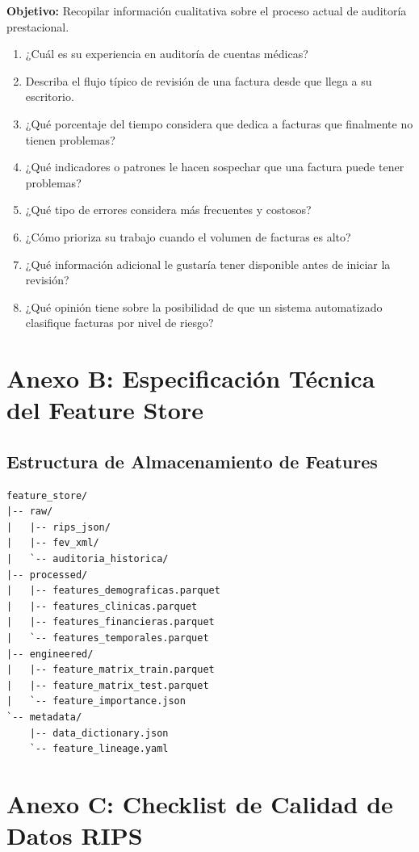 \documentclass[12pt,letterpaper]{report}
\begin{document}
\textbf{Objetivo:} Recopilar información cualitativa sobre el proceso actual de auditoría prestacional.
\begin{enumerate}
    \item ¿Cuál es su experiencia en auditoría de cuentas médicas?
    \item Describa el flujo típico de revisión de una factura desde que llega a su escritorio.
    \item ¿Qué porcentaje del tiempo considera que dedica a facturas que finalmente no tienen problemas?
    \item ¿Qué indicadores o patrones le hacen sospechar que una factura puede tener problemas?
    \item ¿Qué tipo de errores considera más frecuentes y costosos?
    \item ¿Cómo prioriza su trabajo cuando el volumen de facturas es alto?
    \item ¿Qué información adicional le gustaría tener disponible antes de iniciar la revisión?
    \item ¿Qué opinión tiene sobre la posibilidad de que un sistema automatizado clasifique facturas por nivel de riesgo?
\end{enumerate}

\section{Anexo B: Especificación Técnica del Feature Store}

\subsection*{Estructura de Almacenamiento de Features}

\begin{verbatim}
feature_store/
|-- raw/
|   |-- rips_json/
|   |-- fev_xml/
|   `-- auditoria_historica/
|-- processed/
|   |-- features_demograficas.parquet
|   |-- features_clinicas.parquet
|   |-- features_financieras.parquet
|   `-- features_temporales.parquet
|-- engineered/
|   |-- feature_matrix_train.parquet
|   |-- feature_matrix_test.parquet
|   `-- feature_importance.json
`-- metadata/
    |-- data_dictionary.json
    `-- feature_lineage.yaml
\end{verbatim}

\section{Anexo C: Checklist de Calidad de Datos RIPS}
\end{document}
